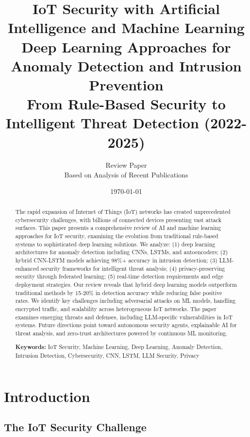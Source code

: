 \documentclass[12pt,a4paper]{article}
\title{
\vspace{-1cm}
{\Huge\bfseries IoT Security with Artificial Intelligence and Machine Learning}\\[0.5cm]
{\Large Deep Learning Approaches for Anomaly Detection and Intrusion Prevention}\\[0.3cm]
{\large From Rule-Based Security to Intelligent Threat Detection (2022-2025)}
}
\author{
\large Review Paper\\[0.2cm]
\normalsize Based on Analysis of Recent Publications
}
\date{\today}
\begin{document}
\maketitle
\thispagestyle{empty}

\begin{abstract}
\noindent
The rapid expansion of Internet of Things (IoT) networks has created unprecedented cybersecurity challenges, with billions of connected devices presenting vast attack surfaces. This paper presents a comprehensive review of AI and machine learning approaches for IoT security, examining the evolution from traditional rule-based systems to sophisticated deep learning solutions. We analyze: (1) deep learning architectures for anomaly detection including CNNs, LSTMs, and autoencoders; (2) hybrid CNN-LSTM models achieving 98\%+ accuracy in intrusion detection; (3) LLM-enhanced security frameworks for intelligent threat analysis; (4) privacy-preserving security through federated learning; (5) real-time detection requirements and edge deployment strategies. Our review reveals that hybrid deep learning models outperform traditional methods by 15-20\% in detection accuracy while reducing false positive rates. We identify key challenges including adversarial attacks on ML models, handling encrypted traffic, and scalability across heterogeneous IoT networks. The paper examines emerging threats and defenses, including LLM-specific vulnerabilities in IoT systems. Future directions point toward autonomous security agents, explainable AI for threat analysis, and zero-trust architectures powered by continuous ML monitoring.

\vspace{0.3cm}
\noindent\textbf{Keywords:} IoT Security, Machine Learning, Deep Learning, Anomaly Detection, Intrusion Detection, Cybersecurity, CNN, LSTM, LLM Security, Privacy
\end{abstract}

\newpage
\tableofcontents
\newpage

\section{Introduction}

\subsection{The IoT Security Challenge}
\end{document}
